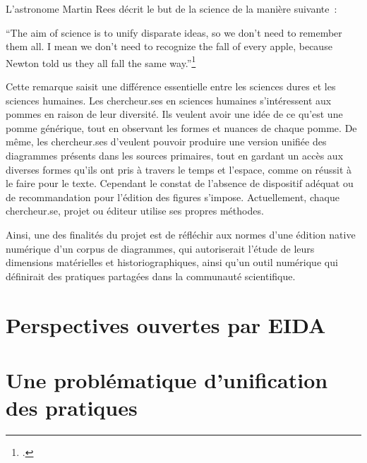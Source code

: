 L'astronome Martin Rees décrit le but de la science de la manière
suivante~:

\begin{kwote}
``The aim of science is to unify disparate ideas, so we don't need to
remember them all. I mean we don't need to recognize the fall of every
apple, because Newton told us they all fall the same way.''\footcite{rees_cosmic_2013}
\end{kwote}

Cette remarque saisit une différence essentielle entre les sciences
dures et les sciences humaines. Les chercheur.ses en sciences humaines
s'intéressent aux pommes en raison de leur
diversité. Ils veulent avoir une idée de ce qu'est une pomme générique,
tout en observant les formes et nuances de chaque pomme. De même, les
chercheur.ses d'\eida veulent pouvoir produire une version unifiée des
diagrammes présents dans les sources primaires, tout en gardant un accès
aux diverses formes qu'ils ont pris à travers le temps et l'espace,
comme on réussit à le faire pour le texte. Cependant le constat de
l'absence de dispositif adéquat ou de recommandation pour l'édition des
figures s'impose. Actuellement, chaque chercheur.se, projet ou éditeur
utilise ses propres méthodes.

Ainsi, une des finalités du projet \eida est de réfléchir aux normes d'une édition native numérique d'un corpus de diagrammes,
qui autoriserait l'étude de leurs dimensions matérielles et
historiographiques, ainsi qu'un outil numérique qui définirait des
pratiques partagées dans la communauté scientifique. 

\hypertarget{perspectives-ouvertes-par-eida}{%
\section{Perspectives ouvertes par EIDA}\label{perspectives-ouvertes-par-eida}}



\hypertarget{une-problematique-de-standardisation}{%
\section{Une problématique d'unification des pratiques}\label{une-problematique-de-standardisation}}



\vspace{2cm}

